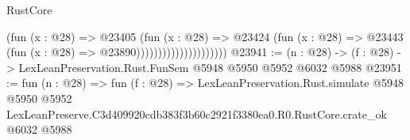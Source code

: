 \begin{lexlean}{RustCore}
\begin{coremodule}
                                      (fun (x : @28) =>
                                      @23405
                                        (fun (x : @28) =>
                                        @23424
                                          (fun (x : @28) =>
                                          @23443 (fun (x : @28) => @23890)))))))))))))))))))))
@23941 := (n : @28) -> (f : @28) -> LexLeanPreservation.Rust.FunSem @5948 @5950 @5952 @6032 @5988
@23951 := fun (n : @28) =>
  fun (f : @28) =>
  LexLeanPreservation.Rust.simulate
    @5948
    @5950
    @5952
    LexLeanPreserve.C3d409920cdb383f3b60c2921f3380ea0.R0.RustCore.crate_ok
    @6032
    @5988
\end{coremodule}
\end{lexlean}
